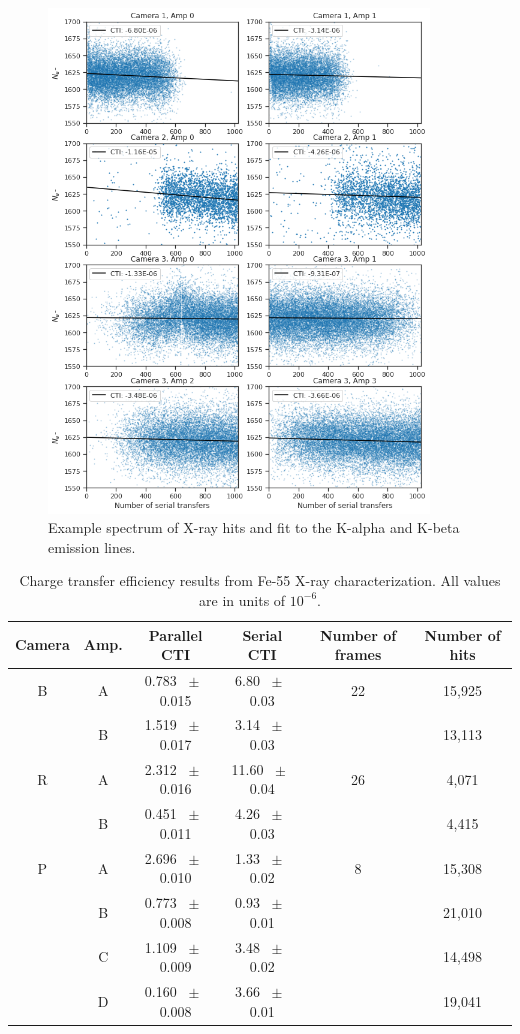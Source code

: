 \begin{figure}
    \centering
    \includegraphics[width=0.9\textwidth]{figures/chap2/xray_cte_serial.png}
    \caption{Example spectrum of X-ray hits and fit to the K-alpha and K-beta emission lines.}
    \label{fig:cte_xray_serial}
\end{figure}

\begin{table}[]
    \centering
    \begin{tabular}{|c|c|c|c|c|c|}\hline
        Camera & Amp. & Parallel CTI & Serial CTI & Number of frames & Number of hits \\\hline
        B & A &0.783 $\;\pm\;$ 0.015 & 6.80 $\;\pm\;$ 0.03 & 22 & 15,925 \\
          & B &1.519 $\;\pm\;$ 0.017 & 3.14 $\;\pm\;$ 0.03 &    & 13,113 \\\hline
        R & A &2.312 $\;\pm\;$ 0.016 & 11.60 $\;\pm\;$ 0.04 & 26 & 4,071 \\
          & B &0.451 $\;\pm\;$ 0.011 & 4.26 $\;\pm\;$ 0.03 &    & 4,415 \\\hline
        P & A &2.696 $\;\pm\;$ 0.010 & 1.33 $\;\pm\;$ 0.02 & 8 & 15,308 \\
          & B &0.773 $\;\pm\;$ 0.008 & 0.93 $\;\pm\;$ 0.01 &   & 21,010 \\
          & C &1.109 $\;\pm\;$ 0.009 & 3.48 $\;\pm\;$ 0.02 &   & 14,498 \\
          & D &0.160 $\;\pm\;$ 0.008 & 3.66 $\;\pm\;$ 0.01 &   & 19,041 \\\hline
    \end{tabular}
    \caption{Charge transfer efficiency results from Fe-55 X-ray characterization. All values are in units of $10^{-6}$.}
    \label{tab:cte_xray}
\end{table}

